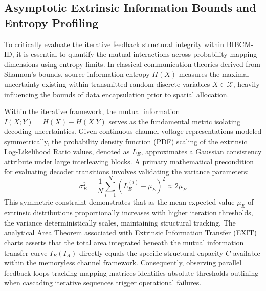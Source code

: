 \documentclass[a4paper,14pt]{extreport}
\begin{document}
\subsection{Asymptotic Extrinsic Information Bounds and Entropy Profiling}
To critically evaluate the iterative feedback structural integrity within BIBCM-ID, it is essential to quantify the mutual interactions across probability mapping dimensions using entropy limits. In classical communication theories derived from Shannon's bounds, source information entropy $H(X)$ measures the maximal uncertainty existing within transmitted random discrete variables $X \in \mathcal{X}$, heavily influencing the bounds of data encapsulation prior to spatial allocation.

Within the iterative framework, the mutual information $I(X; Y) = H(X) - H(X|Y)$ serves as the fundamental metric isolating decoding uncertainties. Given continuous channel voltage representations modeled symmetrically, the probability density function (PDF) scaling of the extrinsic Log-Likelihood Ratio values, denoted as $L_E$, approximates a Gaussian consistency attribute under large interleaving blocks. A primary mathematical precondition for evaluating decoder transitions involves validating the variance parameters:
\begin{equation}
    \sigma_{E}^2 = \frac{1}{N} \sum_{i=1}^{N} \left(L_{E}^{(i)} - \mu_{E}\right)^2 \approx 2\mu_E
\end{equation}
This symmetric constraint demonstrates that as the mean expected value $\mu_{E}$ of extrinsic distributions proportionally increases with higher iteration thresholds, the variance deterministically scales, maintaining structural tracking. The analytical Area Theorem associated with Extrinsic Information Transfer (EXIT) charts asserts that the total area integrated beneath the mutual information transfer curve $I_E(I_A)$ directly equals the specific structural capacity $C$ available within the memoryless channel framework. Consequently, observing parallel feedback loops tracking mapping matrices identifies absolute thresholds outlining when cascading iterative sequences trigger operational failures.
\end{document}
